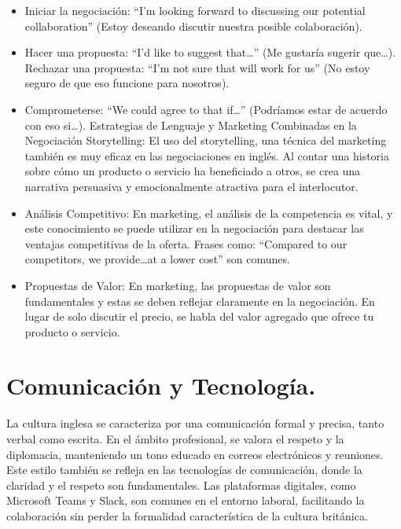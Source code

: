 \documentclass[letterpaper, 12pt]{article}
\begin{document}
\begin{itemize}
      \item Iniciar la negociación: “I’m looking forward to discussing our potential
            collaboration” (Estoy deseando discutir nuestra posible colaboración).
      \item Hacer una propuesta: “I’d like to suggest that…” (Me gustaría sugerir que…).
            Rechazar una propuesta: “I’m not sure that will work for us” (No estoy seguro
            de que eso funcione para nosotros).
      \item Comprometerse: “We could agree to that if…” (Podríamos estar de acuerdo con eso
            si…). Estrategias de Lenguaje y Marketing Combinadas en la Negociación
            Storytelling: El uso del storytelling, una técnica del marketing también es muy
            eficaz en las negociaciones en inglés. Al contar una historia sobre cómo un
            producto o servicio ha beneficiado a otros, se crea una narrativa persuasiva y
            emocionalmente atractiva para el interlocutor.
      \item Análisis Competitivo: En marketing, el análisis de la competencia es vital, y
            este conocimiento se puede utilizar en la negociación para destacar las
            ventajas competitivas de la oferta. Frases como: ``Compared to our competitors,
            we provide\ldots at a lower cost'' son comunes.
      \item Propuestas de Valor: En marketing, las propuestas de valor son fundamentales y
            estas se deben reflejar claramente en la negociación. En lugar de solo discutir
            el precio, se habla del valor agregado que ofrece tu producto o servicio.
\end{itemize}

\section*{Comunicación y Tecnología.}

La cultura inglesa se caracteriza por una comunicación formal y precisa, tanto
verbal como escrita. En el ámbito profesional, se valora el respeto y la
diplomacia, manteniendo un tono educado en correos electrónicos y reuniones.
Este estilo también se refleja en las tecnologías de comunicación, donde la
claridad y el respeto son fundamentales. Las plataformas digitales, como
Microsoft Teams y Slack, son comunes en el entorno laboral, facilitando la
colaboración sin perder la formalidad característica de la cultura británica.
\end{document}
